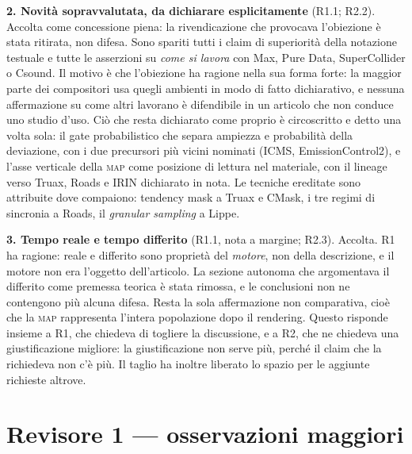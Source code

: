 \documentclass[11pt,a4paper]{article}
\begin{document}
\textbf{2. Novità sopravvalutata, da dichiarare esplicitamente} (R1.1;
R2.2). Accolta come concessione piena: la rivendicazione che provocava
l'obiezione è stata ritirata, non difesa. Sono spariti tutti i claim di
superiorità della notazione testuale e tutte le asserzioni su \emph{come si
lavora} con Max, Pure Data, SuperCollider o Csound. Il motivo è che
l'obiezione ha ragione nella sua forma forte: la maggior parte dei
compositori usa quegli ambienti in modo di fatto dichiarativo, e nessuna
affermazione su come altri lavorano è difendibile in un articolo che non
conduce uno studio d'uso. Ciò che resta dichiarato come proprio è
circoscritto e detto una volta sola: il gate probabilistico che separa
ampiezza e probabilità della deviazione, con i due precursori più vicini
nominati (ICMS, EmissionControl2), e l'asse verticale della \textsc{map}
come posizione di lettura nel materiale, con il lineage verso Truax,
Roads e IRIN dichiarato in nota. Le tecniche ereditate sono attribuite dove
compaiono: tendency mask a Truax e CMask, i tre regimi di sincronia a Roads,
il \emph{granular sampling} a Lippe.

\textbf{3. Tempo reale e tempo differito} (R1.1, nota a margine; R2.3).
Accolta. R1 ha ragione: reale e differito sono proprietà del \emph{motore},
non della descrizione, e il motore non era l'oggetto dell'articolo. La
sezione autonoma che argomentava il differito come premessa teorica è stata
rimossa, e le conclusioni non ne contengono più alcuna difesa. Resta la sola
affermazione non comparativa, cioè che la \textsc{map} rappresenta l'intera
popolazione dopo il rendering. Questo risponde insieme a R1, che chiedeva di
togliere la discussione, e a R2, che ne chiedeva una giustificazione
migliore: la giustificazione non serve più, perché il claim che la
richiedeva non c'è più. Il taglio ha inoltre liberato lo spazio per le
aggiunte richieste altrove.

\section*{Revisore 1 --- osservazioni maggiori}
\end{document}
